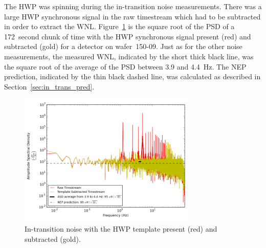 The \ac{HWP} was spinning during the in-transition noise measurements. 
There was a large \ac{HWP} synchronous signal in the raw timestream which had to be subtracted in order to extract the \ac{WNL}. 
Figure~\ref{fig:in_transition_psd} is the square root of the \ac{PSD} of a 172~second chunk of time with the \ac{HWP} synchronous signal present (red) and subtracted (gold) for a detector on wafer~150-09. 
Just as for the other noise measurements, the measured \ac{WNL}, indicated by the short thick black line, was the square root of the average of the \ac{PSD} between 3.9 and 4.4~Hz. 
The \ac{NEP} prediction, indicated by the thin black dashed line, was calculated as described in Section~\ref{sec:in_trans_pred}. 

\begin{figure}[htp]
\begin{center}
\includegraphics[height=2.5in]{figures/board68_wire2_ch04_1356979731s_transition.png}
\caption[In-transition spectral density with and without HWP synchronous signal]{In-transition noise with the \ac{HWP} template present (red) and subtracted (gold).
\label{fig:in_transition_psd} }
\end{center}
\end{figure}


